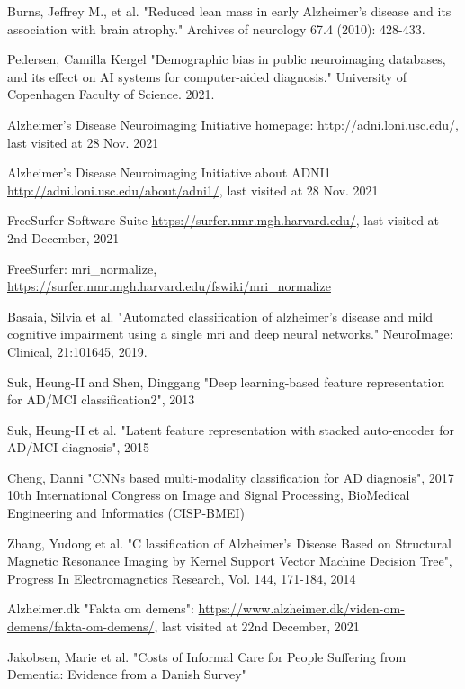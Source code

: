\documentclass[11pt, fleqn, titlepage]{article}
\newcommand{\1}[1]{\mathds{1}\left[#1\right]}
\begin{document}
\begin{thebibliography}{9}
		 Burns, Jeffrey M., et al. "Reduced lean mass in early Alzheimer's disease and its association with brain atrophy." Archives of neurology 67.4 (2010): 428-433.
		
		 Pedersen, Camilla Kergel "Demographic bias in public neuroimaging databases, and its effect on AI systems for computer-aided diagnosis." University of Copenhagen Faculty of Science. 2021.
		
		  Alzheimer’s
		Disease Neuroimaging Initiative homepage: \url{http://adni.loni.usc.edu/}, last visited at 
		28 Nov. 2021
		
		 Alzheimer’s
		Disease Neuroimaging Initiative about ADNI1 \url{http://adni.loni.usc.edu/about/adni1/}, last visited at 28 Nov. 2021
		
		 FreeSurfer Software Suite \url{https://surfer.nmr.mgh.harvard.edu/}, last visited at 2nd December, 2021
		
		 FreeSurfer: mri\_normalize, \url{https://surfer.nmr.mgh.harvard.edu/fswiki/mri_normalize}
		
		 Basaia, Silvia et al. "Automated classification of alzheimer’s disease and mild cognitive impairment using a
		single mri and deep neural networks." NeuroImage: Clinical, 21:101645, 2019.
		
		 Suk, Heung-II and Shen, Dinggang
		 "Deep learning-based feature representation for AD/MCI classification2", 2013
		 
		  Suk, Heung-II et al. "Latent feature representation with stacked auto-encoder for AD/MCI diagnosis", 2015
		
		 Cheng, Danni "CNNs based multi-modality classification for AD diagnosis", 2017 10th International Congress on Image and Signal Processing, BioMedical Engineering and Informatics (CISP-BMEI) 
		
		 Zhang, Yudong et al. "C	lassification of Alzheimer's Disease Based on Structural Magnetic
		Resonance Imaging by Kernel Support Vector Machine Decision Tree", Progress In Electromagnetics Research, Vol. 144, 171-184, 2014
		
		 Alzheimer.dk "Fakta om demens": \url{https://www.alzheimer.dk/viden-om-demens/fakta-om-demens/}, last visited at 22nd December, 2021
		
		 Jakobsen, Marie et al. "Costs of Informal Care for People Suffering from Dementia: Evidence from a Danish Survey"
		

\end{thebibliography}
\end{document}
